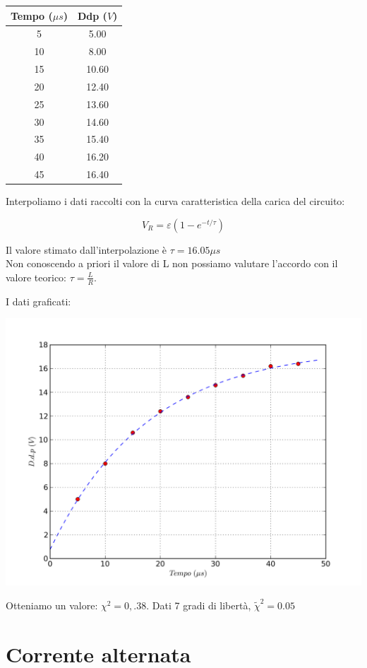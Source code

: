 \begin{center}
\begin{tabular}{*{2}{c}}
Tempo ($\mu s$) & Ddp ($V$) \\
\midrule
5 & 5.00 \\
10 & 8.00 \\
15 & 10.60 \\
20 & 12.40 \\
25 & 13.60 \\
30 & 14.60 \\
35 & 15.40 \\
40 & 16.20 \\
45 & 16.40 \\
\end{tabular}
\end{center}
Interpoliamo i dati raccolti con la curva caratteristica della carica del circuito:

$$V_R = \varepsilon \left( 1-e^{-t/\tau} \right)$$

Il valore stimato dall'interpolazione è $\tau=16.05 \mu s$ \\
Non conoscendo a priori il valore di L non possiamo valutare l'accordo con il valore teorico: $\tau=\frac{L}{R}$.

I dati graficati:
\begin{center}
 \includegraphics[scale=0.70]{grafici/C3/fitindu.png}
\end{center}

Otteniamo un valore: $\chi^2 = 0,.38 $. Dati 7 gradi di libertà, $\tilde{\chi}^2 = 0.05$


\section{Corrente alternata}
